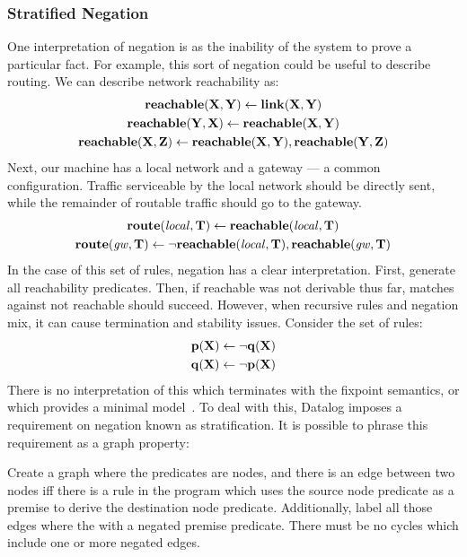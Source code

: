 \subsubsection{Stratified Negation}
One interpretation of negation is as the inability of the system to prove a particular fact.
For example, this sort of negation could be useful to describe routing.
We can describe network reachability as:
\begin{gather*}
        {\bf reachable}({\bf X}, {\bf Y}) \leftarrow {\bf link}({\bf X}, {\bf Y})\\
        {\bf reachable}({\bf Y}, {\bf X}) \leftarrow {\bf reachable}({\bf X}, {\bf Y})\\
        {\bf reachable}({\bf X}, {\bf Z}) \leftarrow {\bf reachable}({\bf X}, {\bf Y}), {\bf reachable}({\bf Y}, {\bf Z})
\end{gather*}
Next, our machine has a local network and a gateway --- a common configuration.
Traffic serviceable by the local network should be directly sent, while the remainder of routable traffic should go to the gateway.
\begin{gather*}
        {\bf route}({\it local}, {\bf T}) \leftarrow {\bf reachable}({\it local}, {\bf T})\\
        {\bf route}({\it gw}, {\bf T}) \leftarrow \neg {\bf reachable}({\it local}, {\bf T}), {\bf reachable}({\it gw}, {\bf T})
\end{gather*}
In the case of this set of rules, negation has a clear interpretation.
First, generate all reachability predicates.
Then, if reachable was not derivable thus far, matches against not reachable should succeed.
However, when recursive rules and negation mix, it can cause termination and stability issues. Consider the set of rules:
\begin{gather*}
        {\bf p}({\bf X}) \leftarrow \neg {\bf q}({\bf X})\\
        {\bf q}({\bf X}) \leftarrow \neg {\bf p}({\bf X})
\end{gather*}
There is no interpretation of this which terminates with the fixpoint semantics, or which provides a minimal model~\cite{prologbook}.
To deal with this, Datalog imposes a requirement on negation known as stratification.
It is possible to phrase this requirement as a graph property:

Create a graph where the predicates are nodes, and there is an edge between two nodes iff there is a rule in the program which uses the source node predicate as a premise to derive the destination node predicate.
Additionally, label all those edges where the with a negated premise predicate.
There must be no cycles which include one or more negated edges.

